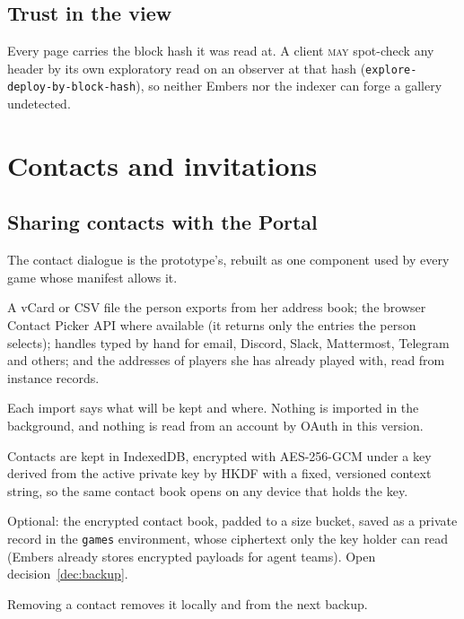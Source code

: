 \documentclass[11pt]{article}
\theoremstyle{definition}
\theoremstyle{remark}
\newcommand{\MAY}{\textsc{may}}
\newcommand{\code}[1]{\texttt{#1}}
\newcommand{\Em}{Embers}
\begin{document}
\subsection{Trust in the view}

Every page carries the block hash it was read at. A client \MAY{} spot-check any
header by its own exploratory read on an observer at that hash
(\code{explore-deploy-by-block-hash}), so neither \Em{} nor the indexer can forge a
gallery undetected.

\section{Contacts and invitations}\label{sec:invite}

\subsection{Sharing contacts with the Portal}

The contact dialogue is the prototype's, rebuilt as one component used by every game
whose manifest allows it.

\begin{description}[leftmargin=*,itemsep=2pt]
\item[Sources.] A vCard or CSV file the person exports from her address book; the
  browser Contact Picker API where available (it returns only the entries the person
  selects); handles typed by hand for email, Discord, Slack, Mattermost, Telegram and
  others; and the addresses of players she has already played with, read from
  instance records.
\item[Consent.] Each import says what will be kept and where. Nothing is imported in
  the background, and nothing is read from an account by OAuth in this version.
\item[Storage.] Contacts are kept in IndexedDB, encrypted with AES-256-GCM under a key
  derived from the active private key by HKDF with a fixed, versioned context string,
  so the same contact book opens on any device that holds the key.
\item[Backup.] Optional: the encrypted contact book, padded to a size bucket, saved as
  a private record in the \code{games} environment, whose ciphertext only the key
  holder can read (\Em{} already stores encrypted payloads for agent teams). Open
  decision~\ref{dec:backup}.
\item[Deletion.] Removing a contact removes it locally and from the next backup.
\end{description}
\end{document}
